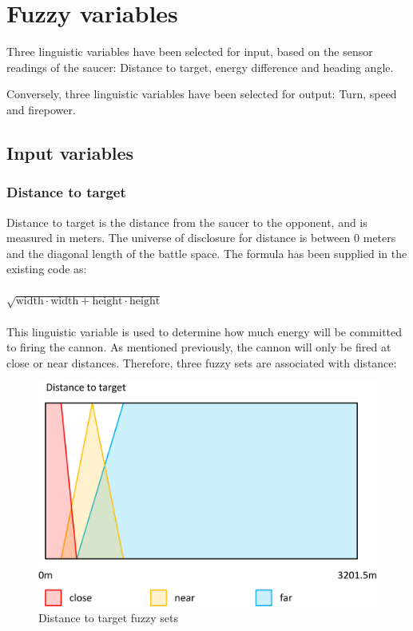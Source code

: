 \newpage

\section{Fuzzy variables}

Three linguistic variables have been selected for input, based on the sensor readings of the saucer: Distance to target, energy difference and heading angle.

Conversely, three linguistic variables have been selected for output: Turn, speed and firepower.

\subsection{Input variables}

\subsubsection{Distance to target}

Distance to target is the distance from the saucer to the opponent, and is measured in meters. The universe of disclosure for distance is between 0 meters and the diagonal length of the battle space. The formula has been supplied in the existing code as:
\\
\\
$\sqrt{\mbox{width} \cdot \mbox{width} + \mbox{height} \cdot \mbox{height}}$
\\
\\
This linguistic variable is used to determine how much energy will be committed to firing the cannon. As mentioned previously, the cannon will only be fired at close or near distances. Therefore, three fuzzy sets are associated with distance:

\begin{figure}[H]
\centering
\caption{Distance to target fuzzy sets}
\includegraphics[scale=0.1]{./img/pdf/distanceSets.pdf}
\end{figure}

